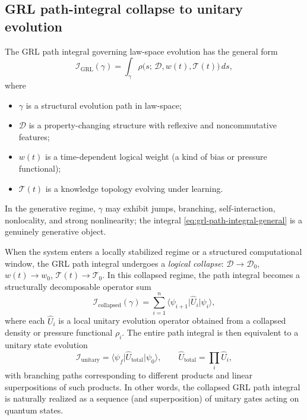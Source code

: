\documentclass[11pt]{book}
\theoremstyle{plain}
\theoremstyle{definition}
\theoremstyle{remark}
\begin{document}
\subsection{GRL path-integral collapse to unitary evolution}

The GRL path integral governing law-space evolution has the general form
\begin{equation}
  \mathcal{I}_{\mathrm{GRL}}(\gamma)
  =
  \int_\gamma
    \rho\bigl(
      s;\,\mathcal{D},
      w(t),
      \mathcal{T}(t)
    \bigr)\, ds,
  \label{eq:grl-path-integral-general}
\end{equation}
where
\begin{itemize}
  \item $\gamma$ is a structural evolution path in law-space;
  \item $\mathcal{D}$ is a property-changing structure with reflexive and
        noncommutative features;
  \item $w(t)$ is a time-dependent logical weight (a kind of bias or
        pressure functional);
  \item $\mathcal{T}(t)$ is a knowledge topology evolving under learning.
\end{itemize}
In the generative regime, $\gamma$ may exhibit jumps, branching,
self-interaction, nonlocality, and strong nonlinearity; the integral
\eqref{eq:grl-path-integral-general} is a genuinely generative object.

When the system enters a locally stabilized regime or a structured
computational window, the GRL path integral undergoes a \emph{logical
collapse}: $\mathcal{D}\to \mathcal{D}_0$, $w(t)\to w_0$,
$\mathcal{T}(t)\to\mathcal{T}_0$. In this collapsed regime, the path
integral becomes a structurally decomposable operator sum
\begin{equation}
  \mathcal{I}_{\mathrm{collapsed}}(\gamma)
  =
  \sum_{i=1}^n
    \bigl\langle
      \psi_{i+1}
      \big| \hat{U}_i \big| \psi_i
    \bigr\rangle,
  \label{eq:grl-collapsed-sum}
\end{equation}
where each $\hat{U}_i$ is a local unitary evolution operator obtained from
a collapsed density or pressure functional $\rho_i$. The entire path
integral is then equivalent to a unitary state evolution
\begin{equation}
  \mathcal{I}_{\mathrm{unitary}}
  =
  \bigl\langle
    \psi_f
    \big| \hat{U}_{\mathrm{total}} \big| \psi_0
  \bigr\rangle,
  \qquad
  \hat{U}_{\mathrm{total}}
  =
  \prod_i \hat{U}_i,
  \label{eq:grl-unitary-total}
\end{equation}
with branching paths corresponding to different products and linear
superpositions of such products. In other words, the collapsed GRL path
integral is naturally realized as a sequence (and superposition) of
unitary gates acting on quantum states.
\end{document}

